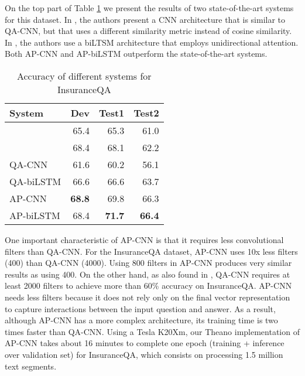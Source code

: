 \documentclass{article}
\begin{document}
On the top part of Table \ref{tab:insuranceqa} we present the results of two state-of-the-art systems for this dataset.
In \cite{feng2015applying},
the authors present a CNN architecture that is similar to QA-CNN,
but that uses a different similarity metric instead of cosine similarity.
In \cite{tan:Arxiv15},
the authors use a biLTSM architecture that employs unidirectional attention.
Both AP-CNN and AP-biLSTM outperform the state-of-the-art systems.

\begin{table}[ht!]
\caption{Accuracy of different systems for InsuranceQA}
\label{tab:insuranceqa}
\vskip 0.15in
\begin{center}
\begin{small}
\begin{sc}
\begin{tabular}{lrrr}
\hline
\abovespace\belowspace
\bf System & \bf Dev  & \bf Test1 & \bf Test2 \\
\hline
\cite{feng2015applying} & 65.4 & 65.3  & 61.0 \\ 
\cite{tan:Arxiv15}  & 68.4 & 68.1 & 62.2 \\
\hline
QA-CNN    & 61.6 & 60.2 & 56.1\\
QA-biLSTM & 66.6 & 66.6 & 63.7 \\
AP-CNN    & \bf 68.8  &  69.8  & 66.3 \\
AP-biLSTM & 68.4 &  \bf 71.7 &  \bf 66.4\\
\hline
\end{tabular}
\end{sc}
\end{small}
\end{center}
\vskip -0.1in
\end{table}


One important characteristic of AP-CNN is that it requires less convolutional filters than QA-CNN.
For the InsuranceQA dataset,
AP-CNN uses 10x less filters (400) than  QA-CNN (4000).
Using 800 filters in AP-CNN produces very similar results as using 400.
On the other hand,
as also found in \cite{feng2015applying},
QA-CNN requires at least 2000 filters to achieve more than 60\% accuracy on InsuranceQA.
AP-CNN needs less filters because it does not rely only on the final vector representation to capture interactions between the input question and answer.
As a result,
although AP-CNN has a more complex architecture,
its training time is two times faster than QA-CNN.
Using a Tesla K20Xm,
our Theano implementation of AP-CNN takes about 16 minutes to complete one epoch (training + inference over validation set) for InsuranceQA,
which consists on processing 1.5 million text segments.
\end{document}
